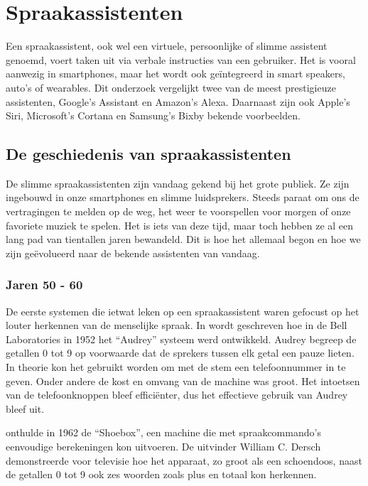 \section{Spraakassistenten}
Een spraakassistent, ook wel een virtuele, persoonlijke of slimme assistent genoemd, voert taken uit via verbale instructies van een gebruiker. Het is vooral aanwezig in smartphones, maar het wordt ook geïntegreerd in smart speakers, auto's of wearables. Dit onderzoek vergelijkt twee van de meest prestigieuze assistenten, Google’s Assistant en Amazon’s Alexa. Daarnaast zijn ook Apple's Siri, Microsoft's Cortana en Samsung's Bixby bekende voorbeelden.

\subsection{De geschiedenis van spraakassistenten}
\label{s:de geschiedenis van spraakassistenten}
De slimme spraakassistenten zijn vandaag gekend bij het grote publiek. Ze zijn ingebouwd in onze smartphones en slimme luidsprekers. Steeds paraat om ons de vertragingen te melden op de weg, het weer te voorspellen voor morgen of onze favoriete muziek te spelen. Het is iets van deze tijd, maar toch hebben ze al een lang pad van tientallen jaren bewandeld. Dit is hoe het allemaal begon en hoe we zijn geëvolueerd naar de bekende assistenten van vandaag.

\subsubsection{Jaren 50 - 60}
De eerste systemen die ietwat leken op een spraakassistent waren gefocust op het louter herkennen van de menselijke spraak. In \textcite{Vox-Creative2019} wordt geschreven hoe in  de Bell Laboratories in 1952 het ``Audrey'' systeem werd ontwikkeld. Audrey begreep de getallen 0 tot 9 op voorwaarde dat de sprekers tussen elk getal een pauze lieten. In theorie kon het gebruikt worden om met de stem een telefoonnummer in te geven. Onder andere de kost en omvang van de machine was groot. Het intoetsen van de telefoonknoppen bleef efficiënter, dus het effectieve gebruik van Audrey bleef uit.

\textcite{IBM2011} onthulde in 1962 de ``Shoebox'', een machine die met spraakcommando's eenvoudige berekeningen kon uitvoeren. De uitvinder William C. Dersch demonstreerde voor televisie hoe het apparaat, zo groot als een schoendoos, naast de getallen 0 tot 9 ook zes woorden zoals plus en totaal kon herkennen.

